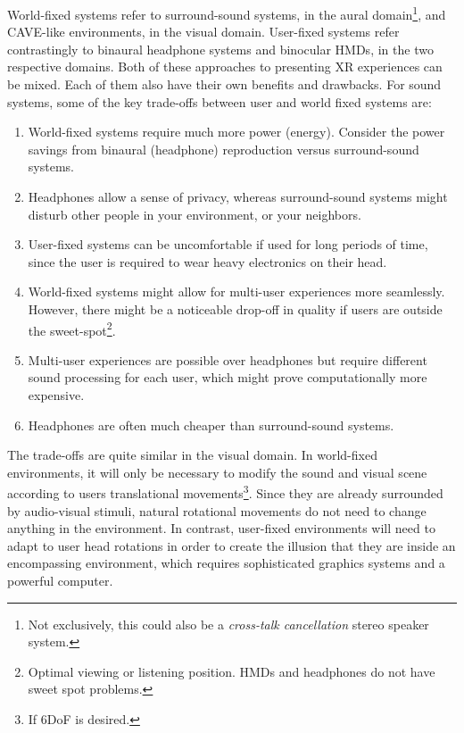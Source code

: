 World-fixed systems refer to surround-sound systems, in the aural domain\footnote{Not exclusively, this could also be a \textit{cross-talk cancellation} stereo speaker system.}, and CAVE-like environments, in the visual domain. User-fixed systems refer contrastingly to binaural headphone systems and binocular HMDs, in the two respective domains. Both of these approaches to presenting XR experiences can be mixed. Each of them also have their own benefits and drawbacks. For sound systems, some of the key trade-offs between user and world fixed systems are:

\begin{enumerate}
    \item World-fixed systems require much more power (energy). Consider the power savings from binaural (headphone) reproduction versus surround-sound systems. 
    \item Headphones allow a sense of privacy, whereas surround-sound systems might disturb other people in your environment, or your neighbors. 
    \item User-fixed systems can be uncomfortable if used for long periods of time, since the user is required to wear heavy electronics on their head. 
    \item World-fixed systems might allow for multi-user experiences more seamlessly. However, there might be a noticeable drop-off in quality if users are outside the sweet-spot\footnote{Optimal viewing or listening position. HMDs and headphones do not have sweet spot problems.}. 
    \item Multi-user experiences are possible over headphones but require different sound processing for each user, which might prove computationally more expensive.
    \item Headphones are often much cheaper than surround-sound systems. 
\end{enumerate}

The trade-offs are quite similar in the visual domain. In world-fixed environments, it will only be necessary to modify the sound and visual scene according to users translational movements\footnote{If 6DoF is desired.}. Since they are already surrounded by audio-visual stimuli, natural rotational movements do not need to change anything in the environment. In contrast, user-fixed environments will need to adapt to user head rotations in order to create the illusion that they are inside an encompassing environment, which requires sophisticated graphics systems and a powerful computer.  

